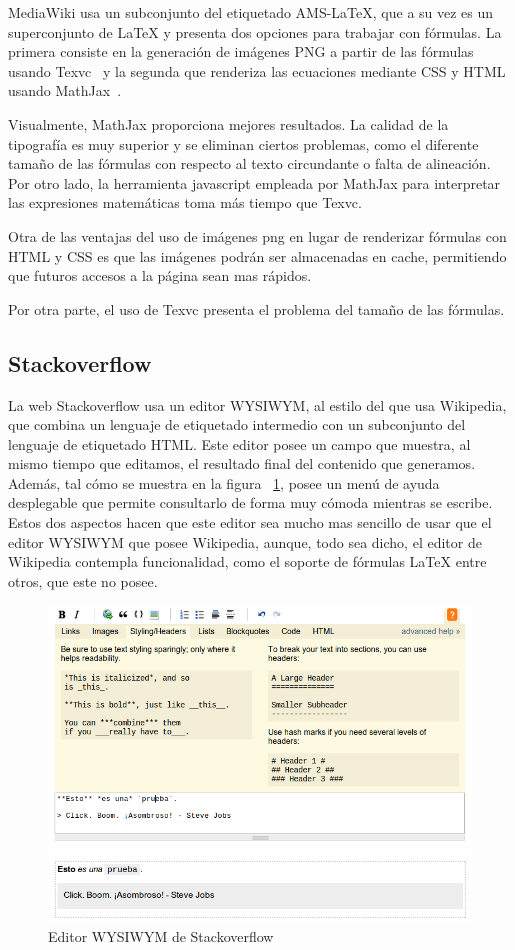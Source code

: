 MediaWiki usa un subconjunto del etiquetado AMS-LaTeX, que a su vez es un superconjunto de {\LaTeX} y presenta dos opciones para trabajar con fórmulas. La primera consiste en la generación de imágenes PNG a partir de las fórmulas usando Texvc~\cite{texvc} y la segunda que renderiza las ecuaciones mediante CSS y HTML usando MathJax~\cite{mathjax}.

Visualmente, MathJax proporciona mejores resultados. La calidad de la tipografía es muy superior y se eliminan ciertos problemas, como el diferente tamaño de las fórmulas con respecto al texto circundante o falta de alineación. Por otro lado, la herramienta javascript empleada por MathJax para interpretar las expresiones matemáticas toma más tiempo que Texvc.

Otra de las ventajas del uso de imágenes png en lugar de renderizar fórmulas con HTML y CSS es que las imágenes podrán ser almacenadas en cache, permitiendo que futuros accesos a la página sean mas rápidos.

Por otra parte, el uso de Texvc presenta el problema del tamaño de las fórmulas.
 
\subsection{Stackoverflow}
La web Stackoverflow usa un editor WYSIWYM, al estilo del que usa Wikipedia, que combina un lenguaje de etiquetado intermedio con un subconjunto del lenguaje de etiquetado HTML. Este editor posee un campo que muestra, al mismo tiempo que editamos, el resultado final del contenido que generamos. Además, tal cómo se muestra en la figura ~\ref{fig:stack_editor}, posee un menú de ayuda desplegable que permite consultarlo de forma muy cómoda mientras se escribe. Estos dos aspectos hacen que este editor sea mucho mas sencillo de usar que el editor WYSIWYM que posee Wikipedia, aunque, todo sea dicho, el editor de Wikipedia contempla funcionalidad, como el soporte de fórmulas LaTeX entre otros, que este no posee. 

\begin{figure}[h!]
  \centering
      \includegraphics[width=1.0\textwidth]{fig/stack_editor}
  \caption{Editor WYSIWYM de Stackoverflow}
  \label{fig:stack_editor}
\end{figure}


